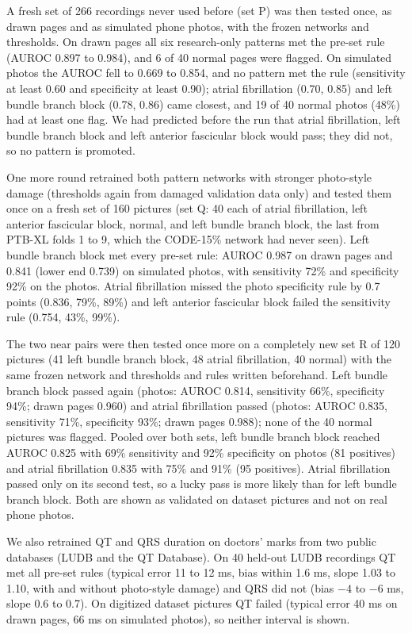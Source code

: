\documentclass[conference]{IEEEtran}
\begin{document}
A fresh set of 266 recordings never used before (set P) was then tested once, as drawn pages and as simulated phone photos, with the frozen networks and thresholds. On drawn pages all six research-only patterns met the pre-set rule (AUROC 0.897 to 0.984), and 6 of 40 normal pages were flagged. On simulated photos the AUROC fell to 0.669 to 0.854, and no pattern met the rule (sensitivity at least 0.60 and specificity at least 0.90); atrial fibrillation (0.70, 0.85) and left bundle branch block (0.78, 0.86) came closest, and 19 of 40 normal photos (48\%) had at least one flag. We had predicted before the run that atrial fibrillation, left bundle branch block and left anterior fascicular block would pass; they did not, so no pattern is promoted.

One more round retrained both pattern networks with stronger photo-style damage (thresholds again from damaged validation data only) and tested them once on a fresh set of 160 pictures (set Q: 40 each of atrial fibrillation, left anterior fascicular block, normal, and left bundle branch block, the last from PTB-XL folds 1 to 9, which the CODE-15\% network had never seen). Left bundle branch block met every pre-set rule: AUROC 0.987 on drawn pages and 0.841 (lower end 0.739) on simulated photos, with sensitivity 72\% and specificity 92\% on the photos. Atrial fibrillation missed the photo specificity rule by 0.7 points (0.836, 79\%, 89\%) and left anterior fascicular block failed the sensitivity rule (0.754, 43\%, 99\%).

The two near pairs were then tested once more on a completely new set R of 120 pictures (41 left bundle branch block, 48 atrial fibrillation, 40 normal) with the same frozen network and thresholds and rules written beforehand. Left bundle branch block passed again (photos: AUROC 0.814, sensitivity 66\%, specificity 94\%; drawn pages 0.960) and atrial fibrillation passed (photos: AUROC 0.835, sensitivity 71\%, specificity 93\%; drawn pages 0.988); none of the 40 normal pictures was flagged. Pooled over both sets, left bundle branch block reached AUROC 0.825 with 69\% sensitivity and 92\% specificity on photos (81 positives) and atrial fibrillation 0.835 with 75\% and 91\% (95 positives). Atrial fibrillation passed only on its second test, so a lucky pass is more likely than for left bundle branch block. Both are shown as validated on dataset pictures and not on real phone photos.

We also retrained QT and QRS duration on doctors' marks from two public databases (LUDB and the QT Database). On 40 held-out LUDB recordings QT met all pre-set rules (typical error 11 to 12 ms, bias within 1.6 ms, slope 1.03 to 1.10, with and without photo-style damage) and QRS did not (bias $-4$ to $-6$ ms, slope 0.6 to 0.7). On digitized dataset pictures QT failed (typical error 40 ms on drawn pages, 66 ms on simulated photos), so neither interval is shown.
\end{document}
